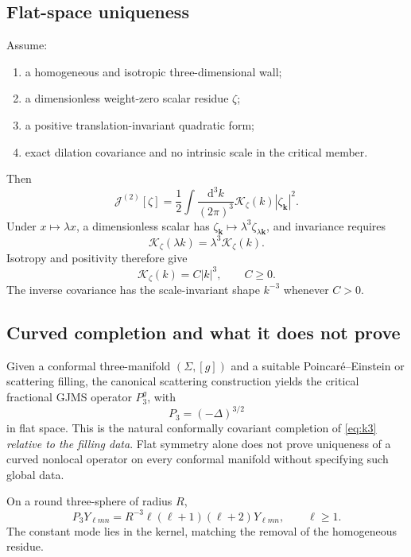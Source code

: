 \documentclass[11pt]{article}
\numberwithin{equation}{section}
\newcommand{\dd}{\mathrm d}
\newcommand{\Kz}{\mathcal K_\zeta}
\theoremstyle{definition}
\theoremstyle{remark}
\begin{document}
\subsection{Flat-space uniqueness}

Assume:
\begin{enumerate}
\item a homogeneous and isotropic three-dimensional wall;
\item a dimensionless weight-zero scalar residue $\zeta$;
\item a positive translation-invariant quadratic form;
\item exact dilation covariance and no intrinsic scale in the critical member.
\end{enumerate}
Then
\begin{equation}
\mathscr J^{(2)}[\zeta]
=\frac12\int\frac{\dd^3k}{(2\pi)^3}\Kz(k)|\zeta_{\bm k}|^2.
\end{equation}
Under $x\mapsto\lambda x$, a dimensionless scalar has $\zeta_{\bm k}\mapsto\lambda^3\zeta_{\lambda\bm k}$, and invariance requires
\begin{equation}
\Kz(\lambda k)=\lambda^3\Kz(k).
\end{equation}
Isotropy and positivity therefore give
\begin{equation}
\boxed{\Kz(k)=C|k|^3,\qquad C\ge0.}
\label{eq:k3}
\end{equation}
The inverse covariance has the scale-invariant shape $k^{-3}$ whenever $C>0$.

\subsection{Curved completion and what it does not prove}

Given a conformal three-manifold $(\Sigma,[g])$ and a suitable Poincar\'e--Einstein or scattering filling, the canonical scattering construction yields the critical fractional GJMS operator $P_3^g$, with
\begin{equation}
P_3=(-\Delta)^{3/2}
\end{equation}
in flat space. This is the natural conformally covariant completion of \eqref{eq:k3} \emph{relative to the filling data}. Flat symmetry alone does not prove uniqueness of a curved nonlocal operator on every conformal manifold without specifying such global data.

On a round three-sphere of radius $R$,
\begin{equation}
\boxed{
P_3Y_{\ell mn}
=R^{-3}\ell(\ell+1)(\ell+2)Y_{\ell mn},
\qquad \ell\ge1.}
\end{equation}
The constant mode lies in the kernel, matching the removal of the homogeneous residue.
\end{document}
